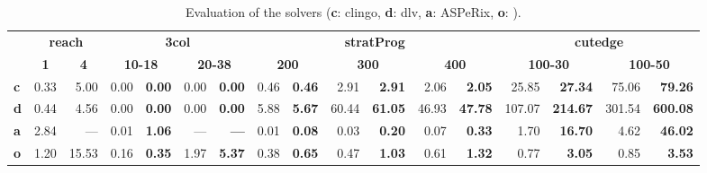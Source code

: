\begin{table}[t]
\centering
\scriptsize
\begin{tabular}{|l|r|r|r@{~~\!}r|r@{~~\!}r|r@{~~\!}r|r@{~~\!}r|r@{~~\!}r|r@{~~\!}r|r@{~~\!}r|}
\cline{2-17}
\multicolumn{1}{c|}{} & \multicolumn{2}{c|}{\textbf{reach}} & \multicolumn{4}{c|}{\textbf{3col}} & \multicolumn{6}{c|}{\textbf{stratProg}} & \multicolumn{4}{c|}{\textbf{cutedge}}\\
\cline{2-17}
\multicolumn{1}{c|}{} & \multicolumn{1}{c|}{\textbf{1}} & \multicolumn{1}{c|}{\textbf{4}} & \multicolumn{2}{c|}{\textbf{10-18}} & \multicolumn{2}{c|}{\textbf{20-38}} & \multicolumn{2}{c|}{\textbf{200}} & \multicolumn{2}{c|}{\textbf{300}} & \multicolumn{2}{c|}{\textbf{400}} & \multicolumn{2}{c|}{\textbf{100-30}} & \multicolumn{2}{c|}{\textbf{100-50}}\\
\hline
\textbf{c} & 0.33 & 5.00 & 0.00 & \textbf{0.00} & 0.00 & \textbf{0.00} & 0.46 & \textbf{0.46} & 2.91 & \textbf{2.91} & 2.06 & \textbf{2.05} & 25.85 & \textbf{27.34} & 75.06 & \textbf{79.26}\\
\hline
\textbf{d} & 0.44 & 4.56 & 0.00 & \textbf{0.00} & 0.00 & \textbf{0.00} & 5.88 & \textbf{5.67} & 60.44 & \textbf{61.05} & 46.93 & \textbf{47.78} & 107.07 & \textbf{214.67} & 301.54 & \textbf{600.08}\\
\hline
\textbf{a} & 2.84 & --- & 0.01 & \textbf{1.06} & --- & \textbf{---} & 0.01 & \textbf{0.08} & 0.03 & \textbf{0.20} & 0.07 & \textbf{0.33} & 1.70 & \textbf{16.70} & 4.62 & \textbf{46.02}\\
\hline
\textbf{o} & 1.20 & 15.53 & 0.16 & \textbf{0.35} & 1.97 & \textbf{5.37} & 0.38 & \textbf{0.65} & 0.47 & \textbf{1.03} & 0.61 & \textbf{1.32} & 0.77 & \textbf{3.05} & 0.85 & \textbf{3.53}\\
\hline
\end{tabular}\vspace{2ex}
\caption{Evaluation of the solvers (\textbf{c}: clingo, \textbf{d}: dlv, \textbf{a}: ASPeRix, \textbf{o}: \omiga).}
\label{tab:experiment}
\end{table}
